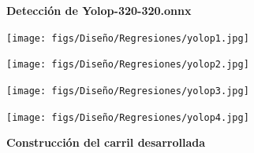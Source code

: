 \begin{figure}[H]
  \centering

  \textbf{Detección de Yolop-320-320.onnx}
  \vspace{0.5cm}

  \begin{minipage}[t]{0.2\textwidth}
      \centering
      \texttt{[image: figs/Diseño/Regresiones/yolop1.jpg]}
      \caption*{}
  \end{minipage}
  \hfill
  \begin{minipage}[t]{0.2\textwidth}
      \centering
      \texttt{[image: figs/Diseño/Regresiones/yolop2.jpg]}
      \caption*{}
  \end{minipage}
  \hfill
  \begin{minipage}[t]{0.2\textwidth}
      \centering
      \texttt{[image: figs/Diseño/Regresiones/yolop3.jpg]}
      \caption*{}
  \end{minipage}
  \hfill
  \begin{minipage}[t]{0.2\textwidth}
      \centering
      \texttt{[image: figs/Diseño/Regresiones/yolop4.jpg]}
      \caption*{}
  \end{minipage}

  \vspace{1cm}

  \textbf{Construcción del carril desarrollada}
  \vspace{0.5cm}


\end{figure}
